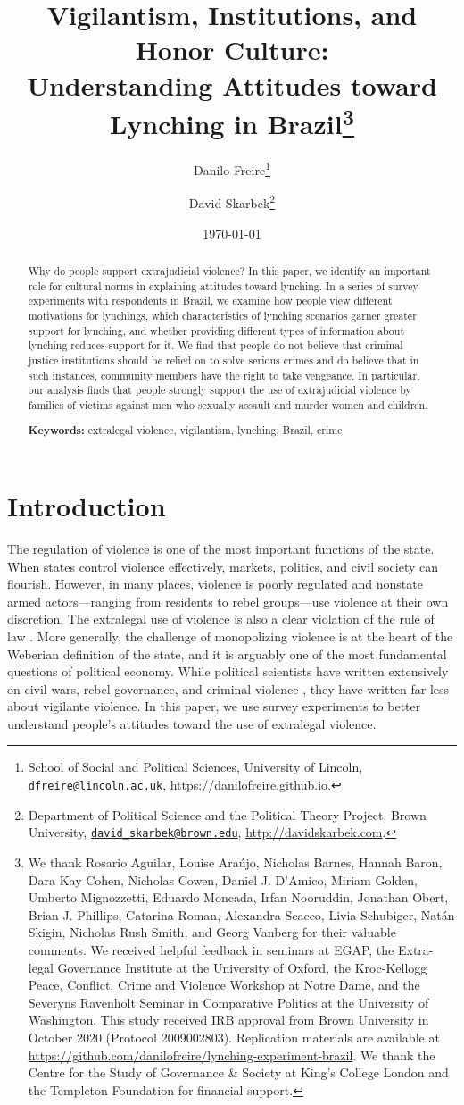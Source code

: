 \documentclass[12pt,a4paper]{article}
\title{Vigilantism, Institutions, and Honor Culture:\\ Understanding Attitudes toward Lynching in Brazil\footnote{We thank Rosario Aguilar, Louise Araújo, Nicholas Barnes, Hannah Baron, Dara Kay Cohen, Nicholas Cowen, Daniel J. D'Amico, Miriam Golden, Umberto Mignozzetti, Eduardo Moncada, Irfan Nooruddin, Jonathan Obert, Brian J. Phillips, Catarina Roman, Alexandra Scacco, Livia Schubiger, Natán Skigin, Nicholas Rush Smith, and Georg Vanberg for their valuable comments. We received helpful feedback in seminars at EGAP, the Extra-legal Governance Institute at the University of Oxford, the Kroc-Kellogg Peace, Conflict, Crime and Violence Workshop at Notre Dame, and the Severyns Ravenholt Seminar in Comparative Politics at the University of Washington. This study received IRB approval from Brown University in October 2020 (Protocol 2009002803). Replication materials are available at \url{https://github.com/danilofreire/lynching-experiment-brazil}. We thank the Centre for the Study of Governance \& Society at King's College London and the Templeton Foundation for financial support.}}
\author{Danilo Freire\footnote{School of Social and Political Sciences, University of Lincoln, \href{mailto:dfreire@lincoln.ac.uk}{\texttt{dfreire@lincoln.ac.uk}}, \url{https://danilofreire.github.io}.} \and David Skarbek\footnote{Department of Political Science and the Political Theory Project, Brown University, \href{mailto:david_skarbek@brown.edu}{\texttt{david\_skarbek@brown.edu}}, \url{http://davidskarbek.com}.}}
\date{\today}
\begin{document}
\maketitle

\begin{abstract}
\doublespacing \noindent Why do people support extrajudicial violence? In this paper, we identify an important role for cultural norms in explaining attitudes toward lynching. In a series of survey experiments with respondents in Brazil, we examine how people view different motivations for lynchings, which characteristics of lynching scenarios garner greater support for lynching, and whether providing different types of information about lynching reduces support for it. We find  that people do not believe that criminal justice institutions should be relied on to solve serious crimes and do believe that in such instances, community members have the right to take vengeance. In particular, our analysis finds that people strongly support the use of extrajudicial violence by families of victims against men who sexually assault and murder women and children. 
\vspace{.25cm}

\noindent \textbf{Keywords:} extralegal violence, vigilantism, lynching, Brazil, crime 
\vspace{.25cm}

\end{abstract}

\newpage

\section{Introduction}
\label{sec:introduction}

\doublespacing

The regulation of violence is one of the most important functions of the state.
When states control violence effectively, markets, politics, and civil society
can flourish. However, in many places, violence is poorly regulated and
nonstate armed actors---ranging from residents to rebel groups---use violence
at their own discretion. The extralegal use of violence is also a clear
violation of the rule of law \citep[48-49]{blair2020peacekeeping}. More
generally, the challenge of monopolizing violence is at the heart of the
Weberian definition of the state, and it is arguably one of the most
fundamental questions of political economy. While political scientists have
written extensively on civil wars, rebel governance, and criminal violence
\citep{arjona2016rebelocracy, trejo2021high, barnes2017criminal}, they have
written far less about vigilante violence. In this paper, we use survey
experiments to better understand people's attitudes toward the use of
extralegal violence. 
\end{document}

